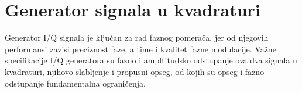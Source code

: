 \documentclass[journal,twocolumn,letterpaper]{IEEEJERM}
\begin{document}
% 
% 
% 
% 




 


\section{Generator signala u kvadraturi}

Generator I/Q signala je ključan za rad faznog pomerača, jer od njegovih performansi zavisi preciznost faze, a time i kvalitet fazne modulacije. Važne specifikacije I/Q generatora su fazno i ampltitudsko odstupanje ova dva signala u kvadraturi, njihovo slabljenje i propusni opseg, od kojih su opseg i fazno odstupanje fundamentalna ograničenja. 

\end{document}
